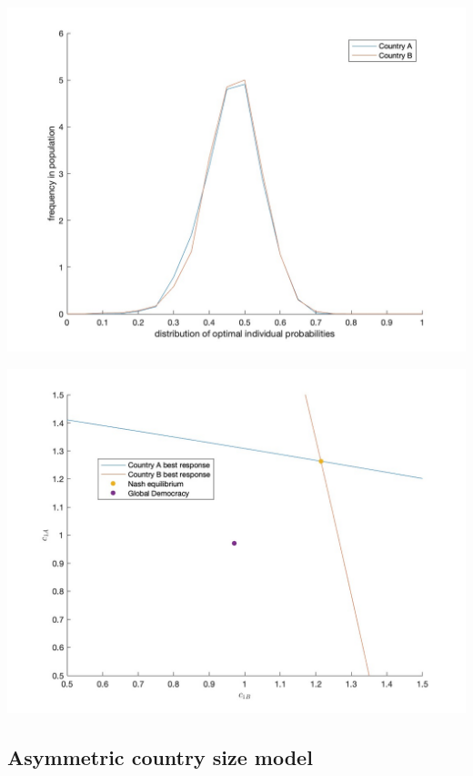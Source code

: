\documentclass[11pt,preprint, authoryear]{elsarticle}
\let\origfigure\figure
\let\endorigfigure\endfigure
\renewenvironment{figure}[1][2] {
    \expandafter\origfigure\expandafter[H]
} {
    \endorigfigure
}
\numberwithin{equation}{section}
\numberwithin{figure}{section}
\numberwithin{table}{section}
\begin{document}
\begin{figure}[H]

{\centering \includegraphics[width=0.75\linewidth]{images/Fig4_0.5Size0Bias} 

}

\caption{Symmetric country size model: Kernel density function of the distribution of the optimal probabilty of crisis and frequency thereof across individuals in country A and country B}\label{fig:Fig 5.1}
\end{figure}

\begin{figure}[H]

{\centering \includegraphics[width=0.75\linewidth]{images/Fig2_0.5Size0Bias} 

}

\caption{Best response functions for symmetric country size model}\label{fig:Fig 5.2}
\end{figure}

\hypertarget{asymmetric-country-size-model}{%
\subsection{Asymmetric country size
model}\label{asymmetric-country-size-model}}
\end{document}
